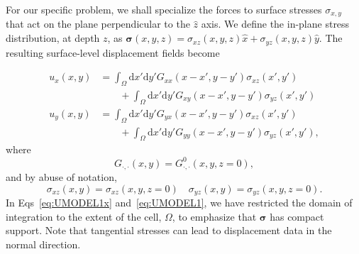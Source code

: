 \documentclass[aps,prl,reprint,twocolumn,groupedaddress,showpacs]{revtex4-1}
\def\dd{\mbox{d}}
\def\r{{\bf r}}
\def\u{{\bf u}}
\def\F{{\bf F}}
\def\F{{\bf F}}
\newcommand{\bs}{\boldsymbol{\sigma}}
\begin{document}
%
%
%
% 

% 

For our specific problem, we shall specialize the forces to surface
stresses $\sigma_{x,y}$ that act on the plane perpendicular to the
$\hat{z}$ axis. We define the in-plane stress distribution, at depth $z$, as
$\bs(x,y,z) = \sigma_{xz}(x,y,z)\hat{x} + \sigma_{yz}(x,y,z)\hat{y}$. 
The resulting surface-level displacement fields become

\begin{align}
u_{x}(x,y) &= \int_\Omega \dd x'\dd y'G_{xx}( x-x',y-y')\sigma_{xz}(x',y') \nonumber\\
&\qquad +  \int_\Omega \dd x'\dd y'G_{xy}( x-x',y-y')\sigma_{yz}(x',y') \label{eq:UMODEL1x}  \\
u_y(x,y) &= \int_\Omega \dd x'\dd y'G_{yx}( x-x',y-y')\sigma_{xz}(x',y') \nonumber\\
&\qquad +  \int_\Omega \dd x'\dd y'G_{yy}( x-x',y-y')\sigma_{yz}(x',y'),  \label{eq:UMODEL1y}  
\end{align}
where
\begin{equation}
G_{\cdot,\cdot}(x,y) = G^0_{\cdot,\cdot}(x,y,z=0),
\end{equation}
and by abuse of notation,
\begin{equation}
\sigma_{xz}(x,y) = \sigma_{xz}(x,y,z=0) \quad \sigma_{yz}(x,y) = \sigma_{yz}(x,y,z=0) .
\end{equation}
In Eqs~\ref{eq:UMODEL1x} and~\ref{eq:UMODEL1}, we have restricted the domain of integration to the extent of the cell, $\Omega$, to emphasize that 
$\boldsymbol\sigma$ has compact support. Note that tangential stresses can lead to displacement data in the normal direction.
\end{document}
